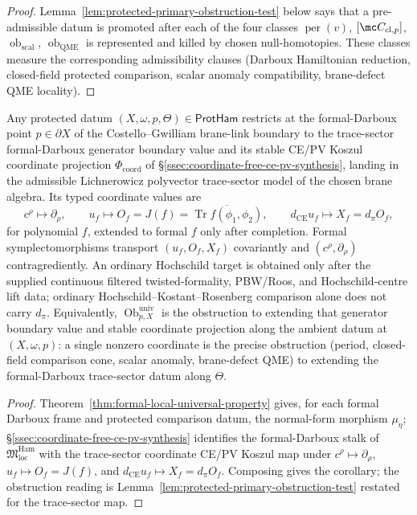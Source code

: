 \begin{proof}
  Lemma~\ref{lem:protected-primary-obstruction-test} below says that a
  pre-admissible datum is promoted after each of the four classes
  \(\operatorname{per}(v)\),
  \([\mc C_{\mathrm{cl},p}]\),
  \(\operatorname{ob}_{\mathrm{scal}}\),
  \(\operatorname{ob}_{\mathrm{QME}}\)
  is represented and killed by chosen null-homotopies.  These classes
  measure the corresponding admissibility clauses
  (Darboux Hamiltonian reduction, closed-field protected comparison,
  scalar anomaly compatibility, brane-defect QME locality).
\end{proof}

\begin{cor}\label{cor:protham-koszul-restriction}
  Any protected datum \((X,\omega,p,\Theta)\in\mathsf{ProtHam}\)
  restricts at the formal-Darboux point \(p\in\partial X\) of the
  Costello--Gwilliam brane-link boundary to the trace-sector
  formal-Darboux generator boundary value and its stable CE/PV Koszul
  coordinate projection
  \(\Phi_{\mathrm{coord}}\) of
  \S\ref{ssec:coordinate-free-ce-pv-synthesis}, landing in the
  admissible Lichnerowicz polyvector trace-sector model of the chosen
  brane algebra.  Its typed coordinate values are
  \[
    c^\rho\longmapsto\partial_\rho,
    \qquad
    u_f\longmapsto O_f=J(f)
      =\overline{\operatorname{Tr}f(\phi_1,\phi_2)},
    \qquad
    d_{\mathrm{CE}}u_f\longmapsto X_f=d_\pi O_f,
  \]
  for polynomial \(f\), extended to formal \(f\) only after completion.
  Formal symplectomorphisms transport
  \((u_f,O_f,X_f)\) covariantly and
  \((c^\rho,\partial_\rho)\) contragrediently.  An ordinary Hochschild
  target is obtained only after the supplied continuous filtered
  twisted-formality, PBW/Roos, and Hochschild-centre lift data; ordinary
  Hochschild--Kostant--Rosenberg comparison alone does not carry
  \(d_\pi\).  Equivalently,
  \(\operatorname{Ob}^{\mathrm{univ}}_{p,X}\) is the obstruction to
  extending that generator boundary value and stable coordinate projection
  along the ambient datum at \((X,\omega,p)\): a single nonzero coordinate is the precise
  obstruction (period, closed-field comparison cone, scalar anomaly,
  brane-defect QME) to extending the formal-Darboux trace-sector datum
  along \(\Theta\).
\end{cor}

\begin{proof}
  Theorem~\ref{thm:formal-local-universal-property} gives, for each
  formal Darboux frame and protected comparison datum, the normal-form
  morphism \(\mu_\eta\);
  \S\ref{ssec:coordinate-free-ce-pv-synthesis}
  identifies the formal-Darboux stalk of
  \(\mathfrak M^{\mathrm{Ham}}_{\mathrm{loc}}\) with the trace-sector
  coordinate CE/PV Koszul map under
  \(c^\rho\mapsto\partial_\rho\),
  \(u_f\mapsto O_f=J(f)\), and
  \(d_{\mathrm{CE}}u_f\mapsto X_f=d_\pi O_f\).  Composing gives the
  corollary; the obstruction reading is
  Lemma~\ref{lem:protected-primary-obstruction-test} restated for the
  trace-sector map.
\end{proof}

